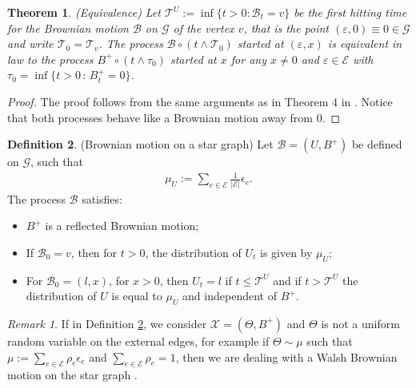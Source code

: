 \documentclass[11pt,a4paper]{article}
\theoremstyle{plain}
\newtheorem{theorem}{Theorem}[section]
\theoremstyle{definition}
\newtheorem{definition}[theorem]{Definition}
\theoremstyle{remark}
\newtheorem{remark}{Remark}
\begin{document}
		\begin{theorem}
			\label{thm:equiv}
			({\it Equivalence}) Let $\mathcal{T}^U:=\inf \{t>0 : \mathcal{B}_t=v\}$ be the first hitting time for the Brownian motion $\mathcal{B}$ on $\mathcal{G}$ of the vertex $v$, that is the point $(\varepsilon, 0) \equiv 0 \in \mathcal{G}$ and write $\mathcal{T}_0 = \mathcal{T}_v$. The process $\mathcal{B} \circ (t \wedge \mathcal{T}_0)$ started at $(\varepsilon, x)$ is equivalent in law to the process $B^+ \circ (t \wedge \tau_0)$ started at $x$ for any $x \neq 0$ and $\varepsilon \in \mathcal{E}$ with $\tau_0 = \inf\{t>0\,:\, B^+_t = 0\}$.
		\end{theorem}
		\begin{proof}
			The proof follows from the same arguments as in Theorem 4 in \cite{BonDov}. Notice that both processes behave like a Brownian motion away from $0$.
		\end{proof}
		
		\begin{definition}(Brownian motion on a star graph)
			\label{bm:graph}
			Let $\mathcal{B}=(U, B^+)$ be defined on $\mathcal{G}$, such that 
			\begin{align*}
				\mu_U := \sum_{e \in \mathcal{E}} \frac{1}{\vert \mathcal{E} \vert} \epsilon_e.
			\end{align*}
			The process $\mathcal{B}$ satisfies:
			\begin{itemize}
				\item $B^+$ is a reflected Brownian motion;
				\item If $\mathcal{B}_0=v$, then for $t>0$, the distribution of $U_t$ is given by $\mu_U$;
				\item For $\mathcal{B}_0=(l,x)$, for $x>0$, then  $U_t=l$ if $t \leq \mathcal{T}^U$ and if $t>\mathcal{T}^U$ the distribution of $U$ is equal to $\mu_U$ and independent of $B^+$.
			\end{itemize}
		\end{definition}
		\begin{remark}
			\label{walsh}
			If in Definition \ref{bm:graph}, we consider $\mathcal{X}=(\Theta,B^+)$ and $\Theta$ is not a uniform random variable on the external edges, for example if $\Theta \sim \mu$ such that $\mu := \sum_{e \in \mathcal{E}} \rho_e \epsilon_e$ and $\sum_{e \in \mathcal{E}} \rho_e = 1$, then we are dealing with a Walsh Brownian motion on the star graph \cite{walsh1978diffusion}.
		\end{remark}
\end{document}
